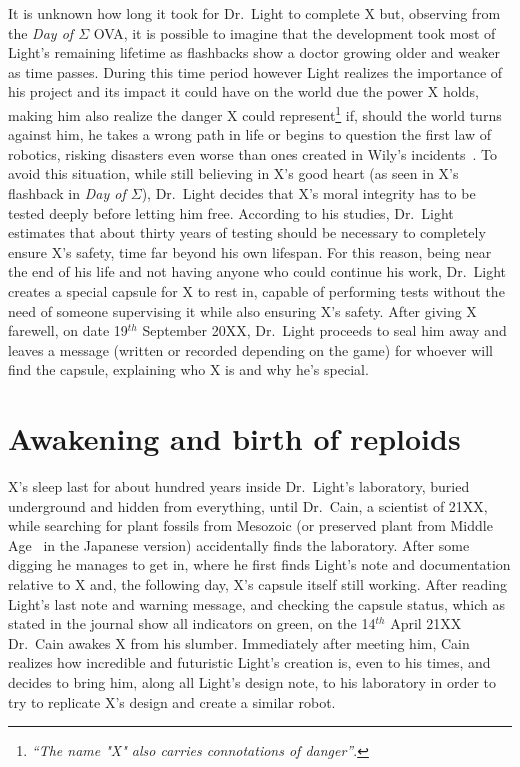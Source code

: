 It is unknown how long it took for Dr.~Light to complete X but, observing from the \emph{Day of $\Sigma$} OVA, it is possible to imagine that the development took most of Light's remaining lifetime as flashbacks show a doctor growing older and weaker as time passes.  During this time period however Light realizes the importance of his project and its impact it could have on the world due the power X holds, making him also realize the danger X could represent\footnote{\textit{``The name "X" also carries connotations of danger''}.} if, should the world turns against him, he takes a wrong path in life or begins to question the first law of robotics, risking disasters even worse than ones created in Wily's incidents~\cite{elysium_light_warning}. To avoid this situation, while still believing in X's good heart (as seen in X's flashback in \emph{Day of $\Sigma$}), Dr.~Light decides that X's moral integrity has to be tested deeply before letting him free. According to his studies, Dr.~Light estimates that about thirty years of testing should be necessary to completely ensure X's safety, time far beyond his own lifespan. For this reason, being near the end of his life and not having anyone who could continue his work, Dr.~Light creates a special capsule for X to rest in, capable of performing tests without the need of someone supervising it while also ensuring X's safety. After giving X farewell, on date 19$^{th}$ September 20XX, Dr.~Light proceeds to seal him away and leaves a message (written or recorded depending on the game) for whoever will find the capsule, explaining who X is and why he's special.

\section{Awakening and birth of reploids}
X's sleep last for about hundred years inside Dr.~Light's laboratory, buried underground and hidden from everything, until Dr.~Cain, a scientist of 21XX, while searching for plant fossils  from Mesozoic (or preserved plant from Middle Age~\cite{elysium_Cain_journal} in the Japanese version) accidentally finds the laboratory. After some digging he manages to get in, where he first finds Light's note and documentation relative to X and, the following day, X's capsule itself still working. After reading Light's last note and warning message, and checking the capsule status, which as stated in the journal show all indicators on green, on the 14$^{th}$ April 21XX Dr.~Cain awakes X from his slumber. Immediately after meeting him, Cain realizes how incredible and futuristic Light's creation is, even to his times, and decides to bring him, along all Light's design note, to his laboratory in order to try to replicate X's design and create a similar robot.

